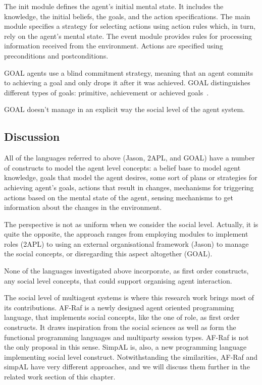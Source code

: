 \documentclass[a4paper,12pt,oneside,fleqn]{book} %
\begin{document}
The init module defines the agent's initial mental state. It includes the
knowledge, the initial beliefs, the goals, and the action specifications.
The main module specifies a strategy for selecting actions using action
rules which, in turn, rely on the agent's mental state. The event module
provides rules for processing information received from the environment.
Actions are specified using preconditions and postconditions.

GOAL agents use a blind commitment strategy, meaning that an agent commits
to achieving a goal and only drops it after it was achieved. GOAL
distinguishes different types of goals: primitive, achievement or achieved
goals~\cite{DBLP:conf/jelia/indriksH08}.

GOAL doesn't manage in an explicit way the social level of the agent system.

\subsection{Discussion} %

All of the languages referred to above (Jason, 2APL, and GOAL) have a number
of constructs to model the agent level concepts: a belief base to model
agent knowledge, goals that model the agent desires, some sort of plans or
strategies for achieving agent's goals, actions that result in changes,
mechanisms for triggering actions based on the mental state of the agent,
sensing mechanisms to get information about the changes in the environment.

The perspective is not as uniform when we consider the social level.
Actually, it is quite the opposite, the approach ranges from employing
modules to implement roles (2APL) to using an external organisational framework
(Jason) to manage the social concepts, or disregarding this aspect
altogether (GOAL). 

None of the languages investigated above incorporate, as first order
constructs, any social level concepts, that could support organising agent
interaction. 

The social level of multiagent systems is where this research
work brings most of its contributions. AF-Raf is a newly designed
agent oriented programming language, that implements social
concepts, like the one of role, as first order constructs. It draws
inspiration from the social sciences as well as form the functional
programming languages and multiparty session types. AF-Raf is not the only
proposal in this sense. SimpAL is, also, a new programming language
implementing social level construct. Notwithstanding the similarities,
AF-Raf and simpAL have very different approaches, and we will discuss them
further in the related work section of this chapter.
\end{document}
